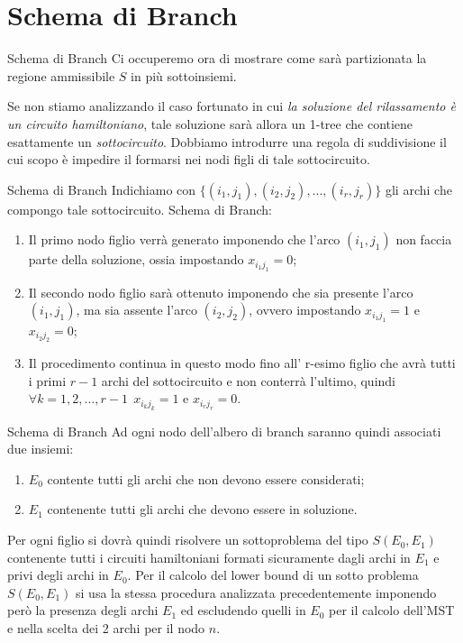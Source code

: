 \documentclass[10pt]{beamer}
\begin{document}
\section{Schema di Branch}
\begin{frame}{Schema di Branch}
    Ci occuperemo ora di mostrare come sarà partizionata la regione ammissibile $S$ in più sottoinsiemi.
    
    Se non stiamo analizzando il caso fortunato in cui \textit{la soluzione del rilassamento è un circuito hamiltoniano}, tale soluzione sarà allora un 1-tree che contiene esattamente un \textit{sottocircuito}. Dobbiamo introdurre una regola di suddivisione il cui scopo è impedire il formarsi nei nodi figli di tale sottocircuito.
\end{frame}

\begin{frame}{Schema di Branch}
    Indichiamo con $\{(i_1, j_1), (i_2,j_2),...,(i_r,j_r)\}$ gli archi che compongo tale sottocircuito.
    \newline
    \newline
    Schema di Branch:
    \begin{enumerate}[<+->]
        \item  Il primo nodo figlio verrà generato imponendo che l'arco $(i_1,j_1)$ non faccia parte della soluzione, ossia impostando $x_{i_{1}j_{1}} = 0$;
        \item Il secondo nodo figlio sarà ottenuto imponendo che sia presente l'arco $(i_1,j_1)$, ma sia assente l'arco $(i_2,j_2)$, ovvero impostando $x_{i_{1}j_{1}} = 1$ e $x_{i_{2}j_{2}} = 0$;
        \item Il procedimento continua in questo modo fino all' r-esimo figlio che avrà tutti i primi $r-1$ archi del sottocircuito e non conterrà l'ultimo, quindi $\forall k = 1,2,...,r-1 \:\:x_{i_{k}j_{k}} = 1$ e $x_{i_{r}j_{r}} = 0$.
    \end{enumerate}
     
\end{frame}

\begin{frame}{Schema di Branch}
    Ad ogni nodo dell'albero di branch saranno quindi associati due insiemi: 
    \begin{enumerate}
        \item $E_0$ contente tutti gli archi che non devono essere considerati;
        \item $E_1$ contenente tutti gli archi che devono essere in soluzione.
    \end{enumerate}
    Per ogni figlio si dovrà quindi risolvere un sottoproblema del tipo $S(E_0, E_1)$ contenente tutti i circuiti hamiltoniani formati sicuramente dagli archi in $E_1$ e privi degli archi in $E_0$.
    \newline
    \newline
    Per il calcolo del lower bound di un sotto problema $S(E_0, E_1)$ si usa la stessa procedura analizzata precedentemente imponendo però la presenza degli archi $E_1$ ed escludendo quelli in $E_0$ per il calcolo dell'MST e nella scelta dei 2 archi per il nodo $n$.
\end{frame}
\end{document}
